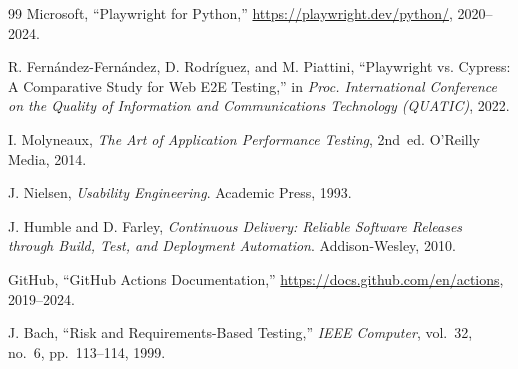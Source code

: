 \documentclass[12pt, a4paper]{article}
\begin{document}
\begin{thebibliography}{99}
Microsoft, ``Playwright for Python,''
\url{https://playwright.dev/python/}, 2020--2024.

R. Fern{\'a}ndez-Fern{\'a}ndez, D. Rodr{\'i}guez, and M. Piattini,
``Playwright vs. Cypress: A Comparative Study for Web E2E Testing,''
in \textit{Proc. International Conference on the Quality of Information
and Communications Technology (QUATIC)}, 2022.

I. Molyneaux, \textit{The Art of Application Performance Testing},
2nd~ed. O'Reilly Media, 2014.

J. Nielsen, \textit{Usability Engineering}. Academic Press, 1993.

J. Humble and D. Farley, \textit{Continuous Delivery: Reliable Software
Releases through Build, Test, and Deployment Automation}.
Addison-Wesley, 2010.

GitHub, ``GitHub Actions Documentation,''
\url{https://docs.github.com/en/actions}, 2019--2024.

J. Bach, ``Risk and Requirements-Based Testing,''
\textit{IEEE Computer}, vol.~32, no.~6, pp.~113--114, 1999.

\end{thebibliography}
\end{document}

